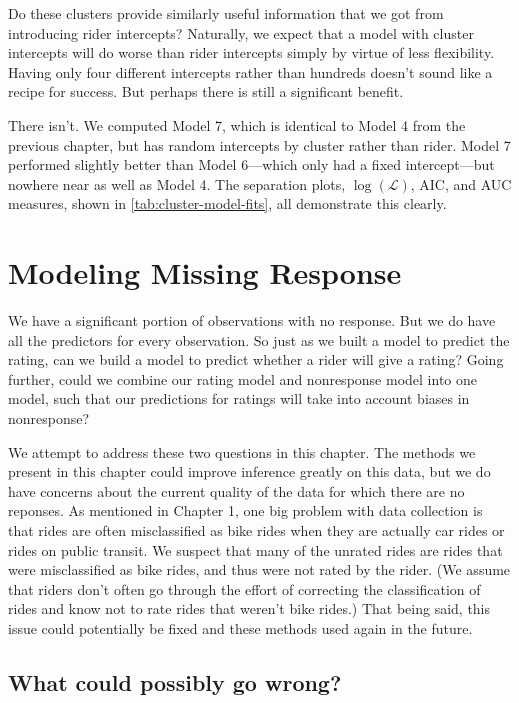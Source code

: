 \documentclass[12pt,twoside]{reedthesis}
\begin{document}
  Do these clusters provide similarly useful information that we got from
  introducing rider intercepts? Naturally, we expect that a model with
  cluster intercepts will do worse than rider intercepts simply by virtue
  of less flexibility. Having only four different intercepts rather than
  hundreds doesn't sound like a recipe for success. But perhaps there is
  still a significant benefit.
  
  There isn't. We computed Model 7, which is identical to Model 4 from the
  previous chapter, but has random intercepts by cluster rather than
  rider. Model 7 performed slightly better than Model 6---which only had a
  fixed intercept---but nowhere near as well as Model 4. The separation
  plots, \(\log (\mathcal{L})\), AIC, and AUC measures, shown in
  \autoref{tab:cluster-model-fits}, all demonstrate this clearly.
  
  \chapter{Modeling Missing Response}\label{modeling-missing-response}
  
  We have a significant portion of observations with no response. But we
  do have all the predictors for every observation. So just as we built a
  model to predict the rating, can we build a model to predict whether a
  rider will give a rating? Going further, could we combine our rating
  model and nonresponse model into one model, such that our predictions
  for ratings will take into account biases in nonresponse?
  
  We attempt to address these two questions in this chapter. The methods
  we present in this chapter could improve inference greatly on this data,
  but we do have concerns about the current quality of the data for which
  there are no reponses. As mentioned in Chapter 1, one big problem with
  data collection is that rides are often misclassified as bike rides when
  they are actually car rides or rides on public transit. We suspect that
  many of the unrated rides are rides that were misclassified as bike
  rides, and thus were not rated by the rider. (We assume that riders
  don't often go through the effort of correcting the classification of
  rides and know not to rate rides that weren't bike rides.) That being
  said, this issue could potentially be fixed and these methods used again
  in the future.
  
  \section{What could possibly go
  wrong?}\label{what-could-possibly-go-wrong}
  
\end{document}
